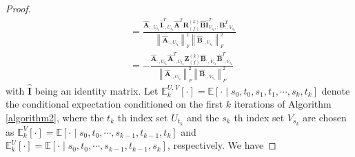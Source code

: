 \documentclass[11pt]{article}
\numberwithin{equation}{section}
\begin{document}
\begin{proof}
$$$$
$$
\begin{aligned}
& =\frac{\hat{\boldsymbol{A}}_{:, U_{t_{k}}} \hat{\boldsymbol{I}}_{:, U_{t_{k}}}^{T} \hat{\boldsymbol{A}}^{T} \boldsymbol{R}_{(f)}^{(k)} \hat{\boldsymbol{B}}\hat{\boldsymbol{I}}_{V_{s_{k}},:}^{T} \boldsymbol{B}^{T} _{:,V_{s_{k}}}}{\left\|\hat{\boldsymbol{A}}_{:, U_{t_{k}}}\right\|_{F}^{2}\left\|\hat{\boldsymbol{B}} _{:,V_{s_{k}}}\right\|_{F}^{2}} \\
& =-\frac{\hat{\boldsymbol{A}}_{:, U_{t_{k}}} \hat{\boldsymbol{A}}_{:, U_{t_{k}}}^{T} \boldsymbol{Z}_{(f)}^{(k)} \hat{\boldsymbol{B}}_{:,V_{s_{k}}} \hat{\boldsymbol{B}}_{:,V_{s_{k}}}^{T}}{\left\|\hat{\boldsymbol{A}}_{:, U_{t_{k}}}\right\|_{F}^{2}\left\|\hat{\boldsymbol{B}}_{:,V_{s_{k}}}\right\|_{F}^{2}}
\end{aligned}
$$
with $\widehat{\boldsymbol{I}}$ being an identity matrix. Let $\mathbb{E}_{k}^{U, V}[\cdot]=\mathbb{E}\left[\cdot \mid s_{0}, t_{0}, s_{1}, t_{1}, \cdots, s_{k}, t_{k}\right]$ denote the conditional expectation conditioned on the first $k$ iterations of Algorithm \ref{algorithm2}, where the $t_{k}$ th index set $U_{t_{k}}$ and the $s_{k}$ th index set $V_{s_{k}}$ are chosen as $\mathbb{E}_{k}^{V}[\cdot]=\mathbb{E}\left[\cdot \mid s_{0}, t_{0}, \cdots, s_{k-1}, t_{k-1}, t_{k}\right]$ and $\mathbb{E}_{k}^{U}[\cdot]=\mathbb{E}\left[\cdot \mid s_{0}, t_{0}, \cdots, s_{k-1}, t_{k-1}, s_{k}\right]$, respectively. We have


\end{proof}
\end{document}
